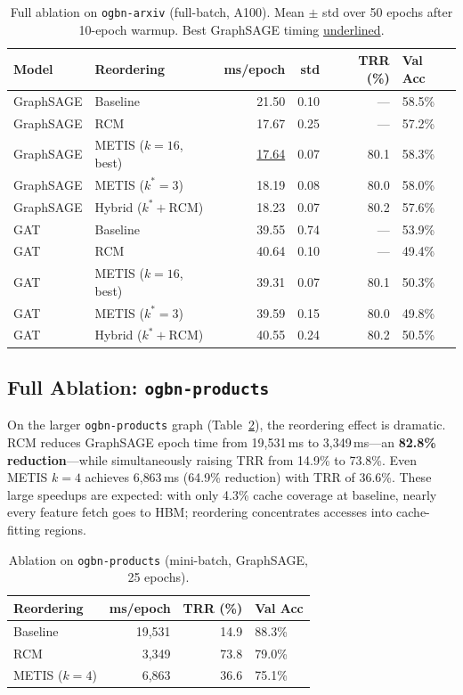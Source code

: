 \documentclass[sigconf,review]{acmart}
\begin{document}
\begin{table}[t]
\centering
\caption{Full ablation on \texttt{ogbn-arxiv} (full-batch, A100). Mean $\pm$ std over 50 epochs after 10-epoch warmup. Best GraphSAGE timing \underline{underlined}.}
\label{tab:ablation}
\begin{tabular}{llrrrl}
\toprule
\textbf{Model} & \textbf{Reordering} & \textbf{ms/epoch} & \textbf{std} & \textbf{TRR (\%)} & \textbf{Val Acc} \\
\midrule
GraphSAGE & Baseline                & 21.50  & 0.10  & ---   & 58.5\% \\
GraphSAGE & RCM                     & 17.67  & 0.25  & ---   & 57.2\% \\
GraphSAGE & METIS ($k{=}16$, best)  & \underline{17.64}  & 0.07  & 80.1  & 58.3\% \\
GraphSAGE & METIS ($k^*{=}3$)       & 18.19  & 0.08  & 80.0  & 58.0\% \\
GraphSAGE & Hybrid ($k^*{+}\text{RCM}$) & 18.23 & 0.07 & 80.2 & 57.6\% \\
\midrule
GAT & Baseline                & 39.55  & 0.74  & ---   & 53.9\% \\
GAT & RCM                     & 40.64  & 0.10  & ---   & 49.4\% \\
GAT & METIS ($k{=}16$, best)  & 39.31  & 0.07  & 80.1  & 50.3\% \\
GAT & METIS ($k^*{=}3$)       & 39.59  & 0.15  & 80.0  & 49.8\% \\
GAT & Hybrid ($k^*{+}\text{RCM}$) & 40.55 & 0.24 & 80.2 & 50.5\% \\
\bottomrule
\end{tabular}
\end{table}

\subsection{Full Ablation: \texttt{ogbn-products}}

On the larger \texttt{ogbn-products} graph (Table~\ref{tab:ablation_products}), the reordering effect is dramatic.
RCM reduces GraphSAGE epoch time from 19{,}531\,ms to 3{,}349\,ms---an \textbf{82.8\% reduction}---while simultaneously raising TRR from 14.9\% to 73.8\%.
Even METIS $k{=}4$ achieves 6{,}863\,ms (64.9\% reduction) with TRR of 36.6\%.
These large speedups are expected: with only 4.3\% cache coverage at baseline, nearly every feature fetch goes to HBM; reordering concentrates accesses into cache-fitting regions.

\begin{table}[h]
\centering
\caption{Ablation on \texttt{ogbn-products} (mini-batch, GraphSAGE, 25 epochs).}
\label{tab:ablation_products}
\begin{tabular}{lrrl}
\toprule
\textbf{Reordering} & \textbf{ms/epoch} & \textbf{TRR (\%)} & \textbf{Val Acc} \\
\midrule
Baseline       & 19{,}531 & 14.9  & 88.3\% \\
RCM            &  3{,}349 & 73.8  & 79.0\% \\
METIS ($k{=}4$) &  6{,}863 & 36.6  & 75.1\% \\
\bottomrule
\end{tabular}
\end{table}
\end{document}
